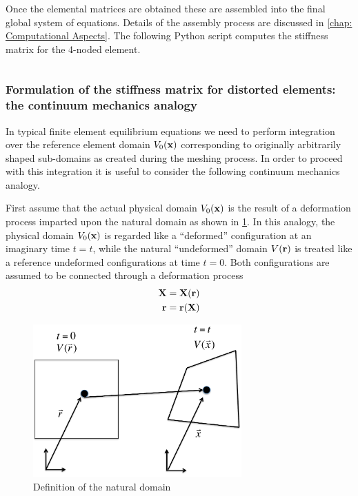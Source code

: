 Once the elemental matrices are obtained these are assembled into the final global system of equations. Details of the assembly process are discussed in \autoref{chap: Computational Aspects}. The following Python script computes the stiffness matrix for the 4-noded element.

\inputminted[]{python}{src/stiff_4nodes.py}

\subsubsection{Formulation of the stiffness matrix for distorted elements: the continuum mechanics analogy}
In typical finite element equilibrium equations we need to perform integration over the reference element domain $V_0(\vb{x})$ corresponding to originally arbitrarily shaped sub-domains as created during the meshing process.  In order to proceed with this integration it is useful to consider the following continuum mechanics analogy.

First assume that the actual physical domain $V_0(\vb{x})$ is the result of a deformation process imparted upon the natural domain as shown in \cref{fig:natural domain}. In this analogy, the physical domain $V_0(\vb{x})$ is regarded like a ``deformed'' configuration at an imaginary time $t=t$, while the natural ``undeformed'' domain $V(\vb{r})$   is treated like a reference undeformed configurations at time $t=0$. Both configurations are assumed to be connected through a deformation process
\begin{equation}
\begin{aligned}
\vb{X}&=\vb{X}(\vb{r})\\
\vb{r}&=\vb{r}(\vb{X})
\end{aligned}
\label{eq:motion}
\end{equation}
\begin{figure}[h]
\centering
\includegraphics[width=8cm]{figure1.pdf}
\caption{Definition of the natural domain}
\label{fig:natural domain}
\end{figure} 

